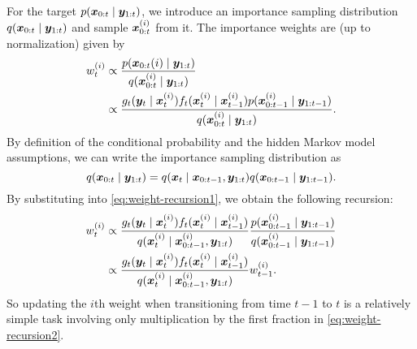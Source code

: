 For the target $p(\bm{x}_{0:t} \mid \bm{y}_{1:t})$, we introduce an importance sampling distribution $q(\bm{x}_{0:t} \mid \bm{y}_{1:t})$ and sample $\bm{x}_{0:t}^{(i)}$ from it. The importance weights are (up to normalization) given by
\begin{equation} \label{eq:weight-recursion1}
\begin{split}
w_t^{(i)} & \propto \frac{p(\bm{x}_{0:t}{(i)} \mid \bm{y}_{1:t})}{q(\bm{x}_{0:t}^{(i)} \mid \bm{y}_{1:t})} \\
& \propto \frac{g_t(\bm{y}_t \mid \bm{x}_t^{(i)}) f_t(\bm{x}_t^{(i)} \mid \bm{x}_{t-1}^{(i)}) p(\bm{x}_{0:t-1}^{(i)} \mid \bm{y}_{1:t-1})}{q(\bm{x}_{0:t}^{(i)} \mid \bm{y}_{1:t})}.
\end{split}
\end{equation}
By definition of the conditional probability and the hidden Markov model assumptions, we can write the importance sampling distribution as
\begin{equation*}
q(\bm{x}_{0:t} \mid \bm{y}_{1:t}) = q(\bm{x}_t \mid \bm{x}_{0:t-1}, \bm{y}_{1:t}) q(\bm{x}_{0:t-1} \mid \bm{y}_{1:t-1}).
\end{equation*}
By substituting into \eqref{eq:weight-recursion1}, we obtain the following recursion:
\begin{equation} \label{eq:weight-recursion2}
\begin{split}
w_t^{(i)} & \propto \frac{g_t(\bm{y}_t \mid \bm{x}_t^{(i)}) f_t(\bm{x}_t^{(i)} \mid \bm{x}_{t-1}^{(i)})}{q(\bm{x}_t^{(i)} \mid \bm{x}_{0:t-1}^{(i)}, \bm{y}_{1:t})} \frac{p(\bm{x}_{0:t-1}^{(i)} \mid \bm{y}_{1:t-1})}{q(\bm{x}_{0:t-1}^{(i)} \mid \bm{y}_{1:t-1})} \\
& \propto \frac{g_t(\bm{y}_t \mid \bm{x}_t^{(i)}) f_t(\bm{x}_t^{(i)} \mid \bm{x}_{t-1}^{(i)})}{q(\bm{x}_t^{(i)} \mid \bm{x}_{0:t-1}^{(i)}, \bm{y}_{1:t})} w_{t-1}^{(i)}.
\end{split}
\end{equation}
So updating the $i$th weight when transitioning from time $t-1$ to $t$ is a relatively simple task involving only multiplication by the first fraction in \eqref{eq:weight-recursion2}.

